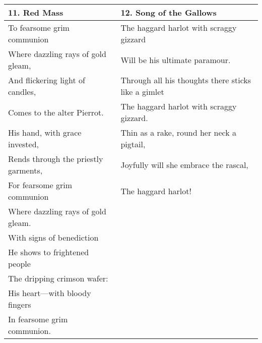 \begin{table}[h!]
\begin{tabular}{p{8.0cm}|p{8.0cm}}
11. Red Mass & 12. Song of the Gallows \\\hline
To fearsome grim communion & The haggard harlot with scraggy gizzard \\
Where dazzling rays of gold gleam, & Will be his ultimate paramour. \\
And flickering light of candles, & Through all his thoughts there sticks like a gimlet \\
Comes to the alter Pierrot. & The haggard harlot with scraggy gizzard. \\
His hand, with grace invested, & Thin as a rake, round her neck a pigtail, \\
Rends through the priestly garments, & Joyfully will she embrace the rascal, \\
For fearsome grim communion & The haggard harlot! \\
Where dazzling rays of gold gleam. & \\
With signs of benediction & \\
He shows to frightened people & \\
The dripping crimson wafer: & \\
His heart—with bloody fingers & \\
In fearsome grim communion. & \\

\end{tabular}
\end{table}


